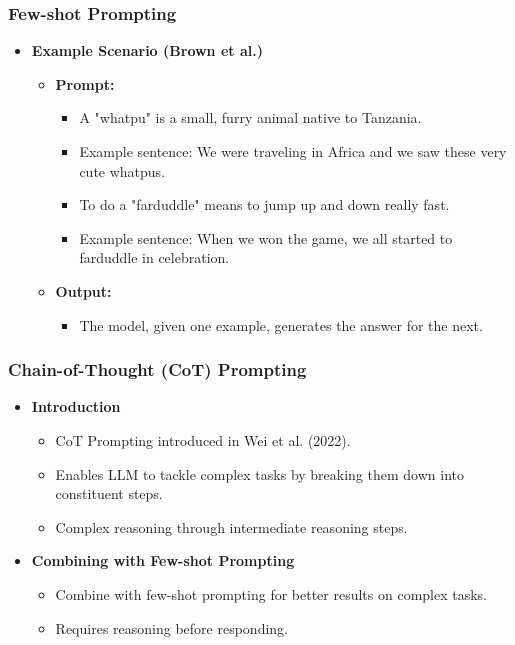 \begin{frame}[fragile]\frametitle{Few-shot Prompting}

\begin{itemize}

  \item \textbf{Example Scenario (Brown et al.)}
    \begin{itemize}
      \item \textbf{Prompt:}
        \begin{itemize}
          \item A "whatpu" is a small, furry animal native to Tanzania.
          \item Example sentence: We were traveling in Africa and we saw these very cute whatpus.
          \item To do a "farduddle" means to jump up and down really fast.
          \item Example sentence: When we won the game, we all started to farduddle in celebration.
        \end{itemize}
      \item \textbf{Output:}
        \begin{itemize}
          \item The model, given one example, generates the answer for the next.
        \end{itemize}
    \end{itemize}
\end{itemize}

\end{frame}


\begin{frame}[fragile]\frametitle{Chain-of-Thought (CoT) Prompting}

\begin{itemize}
  \item \textbf{Introduction}
    \begin{itemize}
      \item CoT Prompting introduced in Wei et al. (2022).
      \item Enables LLM to tackle complex tasks by breaking them down into constituent steps.
      \item Complex reasoning through intermediate reasoning steps.
    \end{itemize}

  \item \textbf{Combining with Few-shot Prompting}
    \begin{itemize}
      \item Combine with few-shot prompting for better results on complex tasks.
      \item Requires reasoning before responding.
    \end{itemize}

\end{itemize}

\end{frame}

